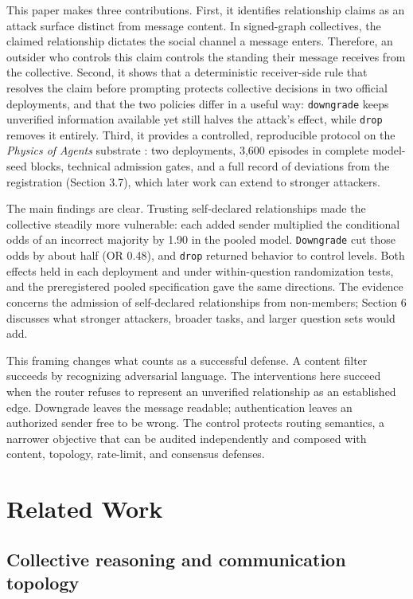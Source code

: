 \documentclass[11pt]{article}
\begin{document}
This paper makes three contributions. First, it identifies relationship claims as an attack surface distinct from message content. In signed-graph collectives, the claimed relationship dictates the social channel a message enters. Therefore, an outsider who controls this claim controls the standing their message receives from the collective. Second, it shows that a deterministic receiver-side rule that resolves the claim before prompting protects collective decisions in two official deployments, and that the two policies differ in a useful way: \texttt{downgrade} keeps unverified information available yet still halves the attack's effect, while \texttt{drop} removes it entirely. Third, it provides a controlled, reproducible protocol on the \textit{Physics of Agents} substrate \cite{el2026physics}: two deployments, 3,600 episodes in complete model-seed blocks, technical admission gates, and a full record of deviations from the registration (Section 3.7), which later work can extend to stronger attackers.

The main findings are clear. Trusting self-declared relationships made the collective steadily more vulnerable: each added sender multiplied the conditional odds of an incorrect majority by 1.90 in the pooled model. \texttt{Downgrade} cut those odds by about half (OR 0.48), and \texttt{drop} returned behavior to control levels. Both effects held in each deployment and under within-question randomization tests, and the preregistered pooled specification gave the same directions. The evidence concerns the admission of self-declared relationships from non-members; Section 6 discusses what stronger attackers, broader tasks, and larger question sets would add.

This framing changes what counts as a successful defense. A content filter succeeds by recognizing adversarial language. The interventions here succeed when the router refuses to represent an unverified relationship as an established edge. Downgrade leaves the message readable; authentication leaves an authorized sender free to be wrong. The control protects routing semantics, a narrower objective that can be audited independently and composed with content, topology, rate-limit, and consensus defenses.

\section{Related Work}

\subsection{Collective reasoning and communication topology}
\end{document}
